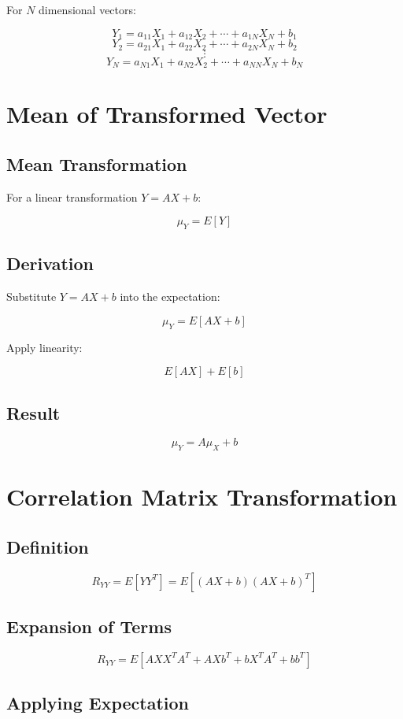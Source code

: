 \documentclass[12pt]{article}
\begin{document}
For $N$ dimensional vectors:

\[
Y_1 = a_{11}X_1 + a_{12}X_2 + \cdots + a_{1N}X_N + b_1
\]
\[
Y_2 = a_{21}X_1 + a_{22}X_2 + \cdots + a_{2N}X_N + b_2
\]
\[
\vdots
\]
\[
Y_N = a_{N1}X_1 + a_{N2}X_2 + \cdots + a_{NN}X_N + b_N
\]

\section{Mean of Transformed Vector}

\subsection{Mean Transformation}

For a linear transformation $Y = AX + b$:

\[
\mu_Y = E[Y]
\]

\subsection{Derivation}

Substitute $Y = AX + b$ into the expectation:

\[
\mu_Y = E[AX + b]
\]

Apply linearity:

\[
E[AX] + E[b]
\]

\subsection{Result}

\[
\mu_Y = A \mu_X + b
\]

\section{Correlation Matrix Transformation}

\subsection{Definition}

\[
R_{YY} = E[Y Y^T] = E[(AX + b)(AX + b)^T]
\]

\subsection{Expansion of Terms}

\[
R_{YY} = E[AXX^T A^T + AXb^T + bX^T A^T + bb^T]
\]

\subsection{Applying Expectation}
\end{document}
